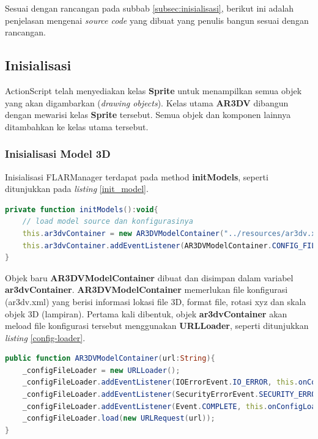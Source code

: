 Sesuai dengan rancangan pada subbab \ref{subsec:inisialisasi}, berikut ini adalah penjelasan mengenai \textit{source code} yang dibuat yang penulis bangun sesuai dengan rancangan. 

\subsection {Inisialisasi}
\label{subsec:implementasi_inisialisasi}
ActionScript telah menyediakan kelas \textbf{Sprite} untuk menampilkan semua objek yang akan digambarkan (\textit{drawing objects}). Kelas utama \textbf{AR3DV} dibangun dengan mewarisi kelas \textbf{Sprite} tersebut. Semua objek dan komponen lainnya ditambahkan ke kelas utama tersebut.

\subsubsection {Inisialisasi Model 3D}
\label{subsubsec:implementasi_inisialisasi_model3d}
Inisialisasi FLARManager terdapat pada method \textbf{initModels}, seperti ditunjukkan pada \textit{listing} \ref{init_model}.
\begin{lstlisting}[language=ActionScript,caption=Inisialisasi model,label=init_model]
private function initModels():void{
	// load model source dan konfigurasinya
	this.ar3dvContainer = new AR3DVModelContainer("../resources/ar3dv.xml");
	this.ar3dvContainer.addEventListener(AR3DVModelContainer.CONFIG_FILE_PARSED,this.onModelsLoaded);
}
\end{lstlisting}

Objek baru \textbf{AR3DVModelContainer} dibuat dan disimpan dalam variabel \textbf{ar3dvContainer}. \textbf{AR3DVModelContainer} memerlukan file konfigurasi (ar3dv.xml) yang berisi informasi lokasi file 3D, format file, rotasi xyz dan skala objek 3D (lampiran). Pertama kali dibentuk, objek \textbf{ar3dvContainer} akan meload file konfigurasi tersebut menggunakan \textbf{URLLoader}, seperti ditunjukkan \textit{listing} \ref{config-loader}.

\begin{lstlisting}[language=ActionScript,caption=Load Config AR3DV,label=config-loader]
public function AR3DVModelContainer(url:String){
	_configFileLoader = new URLLoader();
	_configFileLoader.addEventListener(IOErrorEvent.IO_ERROR, this.onConfigLoaded);
	_configFileLoader.addEventListener(SecurityErrorEvent.SECURITY_ERROR, this.onConfigLoaded);
	_configFileLoader.addEventListener(Event.COMPLETE, this.onConfigLoaded);
	_configFileLoader.load(new URLRequest(url));
}
\end{lstlisting}

